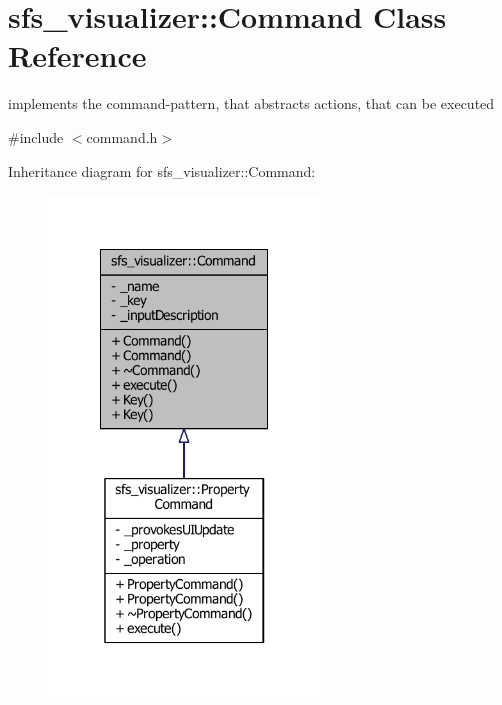 \section{sfs\-\_\-visualizer\-:\-:Command Class Reference}
\label{classsfs__visualizer_1_1Command}


implements the command-\/pattern, that abstracts actions, that can be executed  




{\ttfamily \#include $<$command.\-h$>$}



Inheritance diagram for sfs\-\_\-visualizer\-:\-:Command\-:\nopagebreak
\begin{figure}[H]
\begin{center}
\leavevmode
\includegraphics[width=204pt]{d4/d10/classsfs__visualizer_1_1Command__inherit__graph}
\end{center}
\end{figure}


